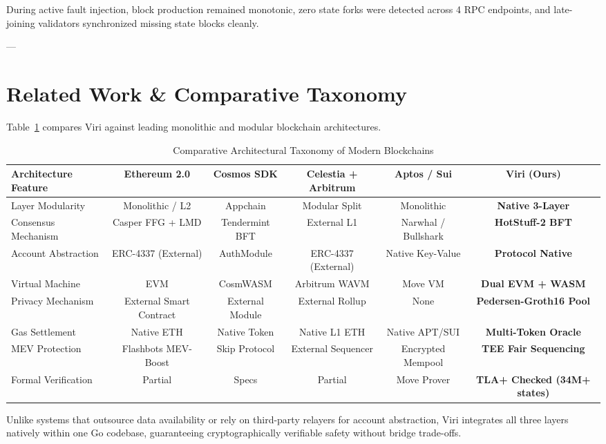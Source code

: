 \documentclass[10pt,journal,compsoc,twocolumn]{IEEEtran}
\begin{document}
During active fault injection, block production remained monotonic, zero state forks were detected across 4 RPC endpoints, and late-joining validators synchronized missing state blocks cleanly.

---

\section{Related Work \& Comparative Taxonomy}
\label{sec:related_work}

Table~\ref{tab:taxonomy} compares Viri against leading monolithic and modular blockchain architectures.

\begin{table}[t]
\caption{Comparative Architectural Taxonomy of Modern Blockchains}
\label{tab:taxonomy}
\centering
\begin{tabular}{lccccc}
\toprule
\textbf{Architecture Feature} & \textbf{Ethereum 2.0} & \textbf{Cosmos SDK} & \textbf{Celestia + Arbitrum} & \textbf{Aptos / Sui} & \textbf{Viri (Ours)} \\
\midrule
Layer Modularity & Monolithic / L2 & Appchain & Modular Split & Monolithic & \textbf{Native 3-Layer} \\
Consensus Mechanism & Casper FFG + LMD & Tendermint BFT & External L1 & Narwhal / Bullshark & \textbf{HotStuff-2 BFT} \\
Account Abstraction & ERC-4337 (External) & AuthModule & ERC-4337 (External) & Native Key-Value & \textbf{Protocol Native} \\
Virtual Machine & EVM & CosmWASM & Arbitrum WAVM & Move VM & \textbf{Dual EVM + WASM} \\
Privacy Mechanism & External Smart Contract & External Module & External Rollup & None & \textbf{Pedersen-Groth16 Pool} \\
Gas Settlement & Native ETH & Native Token & Native L1 ETH & Native APT/SUI & \textbf{Multi-Token Oracle} \\
MEV Protection & Flashbots MEV-Boost & Skip Protocol & External Sequencer & Encrypted Mempool & \textbf{TEE Fair Sequencing} \\
Formal Verification & Partial & Specs & Partial & Move Prover & \textbf{TLA+ Checked (34M+ states)} \\
\bottomrule
\end{tabular}
\end{table}

Unlike systems that outsource data availability or rely on third-party relayers for account abstraction, Viri integrates all three layers natively within one Go codebase, guaranteeing cryptographically verifiable safety without bridge trade-offs.
\end{document}
